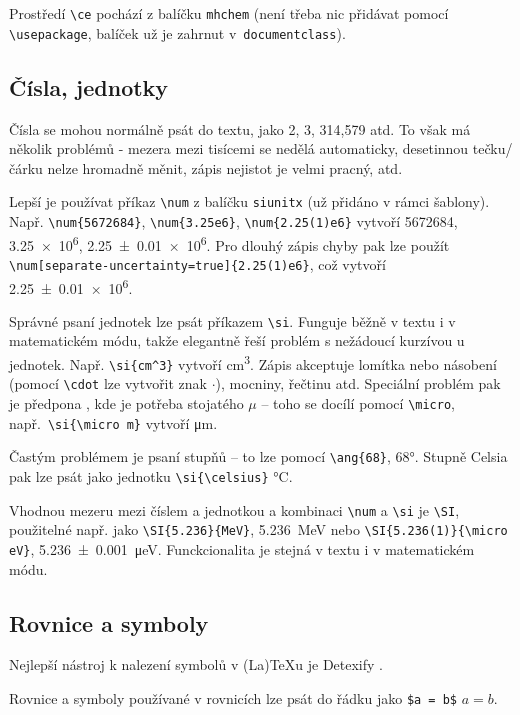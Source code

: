 \documentclass{cygclanek}
\begin{document}
Prostředí \verb|\ce| pochází z balíčku \verb|mhchem| \cite{ctan_mhchem} (není třeba nic přidávat 
pomocí \verb|\usepackage|, balíček už je zahrnut v~\verb|documentclass|).

\subsection{Čísla, jednotky}
Čísla se mohou normálně psát do textu, jako 2, 3, 314,579 atd. To však má několik 
problémů - mezera mezi tisícemi se nedělá automaticky, desetinnou tečku/čárku nelze hromadně měnit, 
zápis nejistot je velmi pracný, atd.

Lepší je používat příkaz \verb|\num| z balíčku \verb|siunitx| \cite{ctan_siunitx} (už přidáno 
v rámci šablony). Např. \verb|\num{5672684}|, \verb|\num{3.25e6}|, \verb|\num{2.25(1)e6}| vytvoří 
\num{5672684}, \num{3.25e6}, \num{2.25(1)e6}. Pro dlouhý zápis chyby pak lze použít 
\verb|\num[separate-uncertainty=true]{2.25(1)e6}|, což vytvoří \num[separate-uncertainty=true]{2.25(1)e6}.

    Správné psaní jednotek lze psát příkazem \verb|\si|. Funguje běžně v textu i v matematickém módu, takže 
    elegantně řeší problém s nežádoucí kurzívou u jednotek. Např. \verb|\si{cm^3}| vytvoří \si{cm^3}. 
    Zápis akceptuje lomítka nebo násobení (pomocí \verb|\cdot| lze vytvořit znak $\cdot$), mocniny, řečtinu atd. 
    Speciální problém pak je předpona , kde je potřeba stojatého $\mu$ -- toho se docílí pomocí 
    \verb|\micro|, např.~\verb|\si{\micro m}| vytvoří \si{\micro m}. 

    Častým problémem je psaní stupňů -- to lze pomocí \verb|\ang{68}|, \ang{68}. Stupně Celsia pak lze psát 
    jako jednotku \verb|\si{\celsius}| \si{\celsius}.


Vhodnou mezeru mezi číslem a jednotkou a kombinaci \verb|\num| a \verb|\si| je \verb|\SI|, použitelné např.
    jako \verb|\SI{5.236}{MeV}|, \SI{5.236}{MeV} nebo \verb|\SI{5.236(1)}{\micro eV}|, \SI{5.236(1)}{\micro eV}. 
    Funckcionalita je stejná v textu i v matematickém módu.


\subsection{Rovnice a symboly}
    Nejlepší nástroj k nalezení symbolů v (La)\TeX u je Detexify \cite{detexify}.

Rovnice a symboly používané v rovnicích lze psát do řádku jako \verb|$a = b$| $a = b$. 
\end{document}
